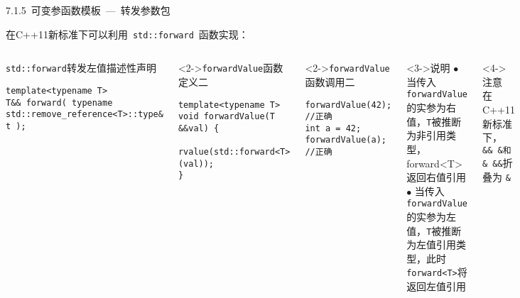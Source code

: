 \begin{frame}[fragile]{7.1.5~可变参函数模板\normalsize{~---~转发参数包}}

在C++11新标准下可以利用~\alert{\texttt{std::forward}}~函数实现：

\vspace{-4mm}

\begin{columns}[t]

\begin{blueblock}{\texttt{std::forward}转发左值描述性声明}
\vspace{-2mm}\begin{lstlisting}[basicstyle=\scriptsize\ttfamily,moreemph={T}]
template<typename T>
T&& forward( typename std::remove_reference<T>::type& t );
\end{lstlisting}\vspace{-2mm}
\end{blueblock}
\begin{blueblock}<2->{\texttt{forwardValue}函数定义二}
\vspace{-2mm}\begin{lstlisting}[moreemph={T}]
template<typename T>
void forwardValue(T &&val) {
    rvalue(std::forward<T>(val));
}
\end{lstlisting}\vspace{-2mm}
\end{blueblock}
\begin{blueblock}<2->{\texttt{forwardValue}函数调用二}
\vspace{-2mm}\begin{lstlisting}[moreemph={T}]
forwardValue(42);       //正确
int a = 42;
forwardValue(a);        //正确
\end{lstlisting}\vspace{-2mm}
\end{blueblock}

\begin{yellowblock}<3->{说明}
$\bullet$ 当传入\texttt{forwardValue}的实参为右值，\texttt{T}被推断为非引用类型，forward<T>返回右值引用\\
$\bullet$ 当传入\texttt{forwardValue}的实参为左值，\texttt{T}被推断为左值引用类型，此时\texttt{forward<T>}将返回左值引用
\end{yellowblock}
\vspace{-2mm}
\begin{redblock}<4->{注意}
在C++11新标准下，\\
\texttt{\&\& \&和\& \&\&}折叠为 \texttt{\&}
\end{redblock}

\end{columns}

\end{frame}


 